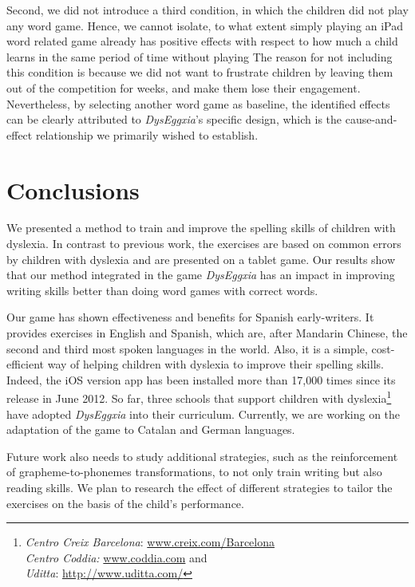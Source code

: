 \documentclass[letterpaper]{sig-alternate-2013}
\begin{document}
Second, we did not introduce a third condition, in which the children did not play any word game. Hence, we cannot isolate, to what extent simply playing an iPad word related game already has positive effects with respect to how much a child learns in the same period of time without playing
The reason for not including this condition is because we did not want to frustrate children by leaving them out of the competition for weeks, and make them lose their engagement.
Nevertheless, by selecting another word game as baseline, the identified effects can be clearly attributed to {\it DysEggxia}'s specific design, which is the cause-and-effect relationship we primarily wished to establish.


\section{Conclusions}


We presented a method to train and improve the spelling skills of children with dyslexia. In contrast to previous work, the exercises are based on common errors by children with dyslexia and are presented on a tablet game. Our results show that our method integrated in the game {\it DysEggxia} has an impact in improving writing skills better than doing word games with correct words.

Our game has shown effectiveness and benefits for Spanish early-writers. It provides exercises in English and Spanish, which are, after Mandarin Chinese, the second and third most spoken languages in the world. Also, it is a simple, cost-efficient way of helping children with dyslexia to improve their spelling skills. Indeed, the iOS version app has been installed more than 17,000 times since its release in June 2012. So far, three schools that support children with dyslexia\footnote{ {\it Centro Creix Barcelona}: {\small{\url{www.creix.com/Barcelona}}}\\ {\it Centro Coddia:} {\small{\url{www.coddia.com}}} and \\ {\it Uditta}: {\small{\url{http://www.uditta.com/}}}} have adopted {\it DysEggxia} into their curriculum. Currently, we are working on the adaptation of the game to Catalan and German languages.

Future work also needs to study additional strategies, such as the reinforcement of grapheme-to-phonemes transformations, to not only train writing but also reading skills. We plan to research the effect of different strategies to tailor the exercises on the basis of the child's performance. 
\end{document}
